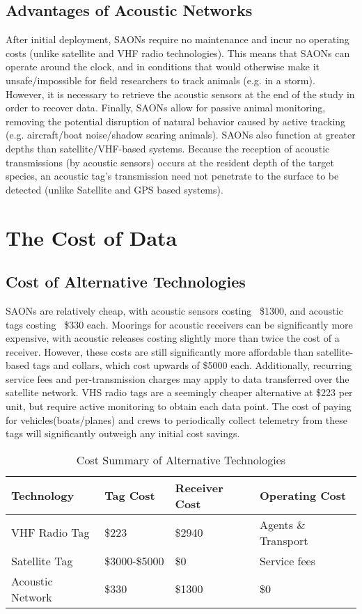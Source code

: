\subsection{Advantages of Acoustic Networks}
After initial deployment, SAONs require no maintenance and incur no operating costs (unlike satellite and VHF radio technologies).  This means that SAONs can operate around the clock, and in conditions that would otherwise make it unsafe/impossible for field researchers to track animals (e.g. in a storm)\cite{Heupel2006}.  However, it is necessary to retrieve the acoustic sensors at the end of the study in order to recover data\cite{Heupel2006}.  Finally, SAONs allow for passive animal monitoring, removing the potential disruption of natural behavior caused by active tracking (e.g. aircraft/boat noise/shadow scaring animals)\cite{Heupel2006}.  SAONs also function at greater depths than satellite/VHF-based systems.  Because the reception of acoustic transmissions (by acoustic sensors) occurs at the resident depth of the target species, an acoustic tag's transmission need not penetrate to the surface to be detected (unlike Satellite and GPS based systems).




\section{The Cost of Data}
\subsection{Cost of Alternative Technologies}
SAONs are relatively cheap, with acoustic sensors costing ~\$1300, and acoustic tags costing ~\$330 each.  Moorings for acoustic receivers can be significantly more expensive, with acoustic releases costing slightly more than twice the cost of a receiver.  However, these costs are still significantly more affordable than satellite-based tags and collars, which cost upwards of \$5000 each\cite{wildlifetracking}.  Additionally, recurring service fees and per-transmission charges may apply to data transferred over the satellite network.  VHS radio tags are a seemingly cheaper alternative at \$223 per unit, but require active monitoring to obtain each data point.  The cost of paying for vehicles(boats/planes) and crews to periodically collect telemetry from these tags will significantly outweigh any initial cost savings.

\begin{table}[h!]
		\label{CostAltTech}
		\begin{tabular}{l l l l}
Technology&Tag Cost&Receiver Cost&Operating Cost\\
\hline
			VHF Radio Tag		 & \$223\cite{telonicsFIS-550}           & \$2940\cite{telonicsTR-5}  & Agents \& Transport\\
			Satellite Tag 	     & \$3000-\$5000\cite{wildlifetracking}  & \$0    					  & Service fees\\
			Acoustic Network 	 & \$330         						 & \$1300 					  & \$0\\
		\end{tabular}
		\caption{Cost Summary of Alternative Technologies}
\end{table}

